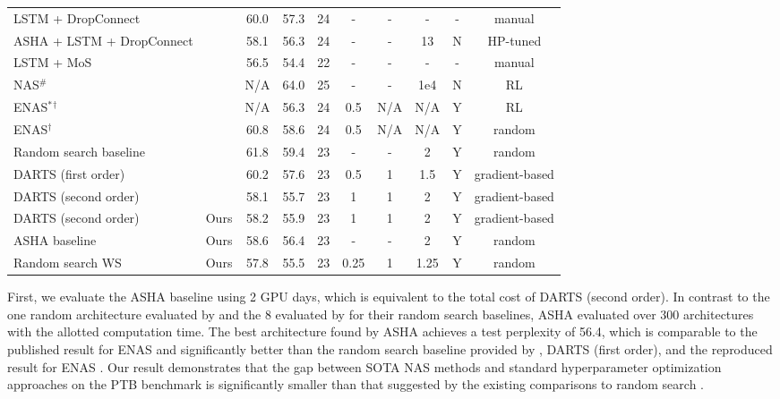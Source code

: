 \documentclass[acmlarge, nonacm]{acmart}
\begin{document}
\begin{table}[h]
{\begin{tabular}{lccccccccc}
\hline
LSTM + DropConnect & \citep{merity2018awd} & 60.0 & 57.3 & 24 & - & - & - & - & manual \\
ASHA + LSTM + DropConnect & \citep{asha} & 58.1 & 56.3 & 24 & - & - & 13 & N & HP-tuned\\
LSTM + MoS & \citep{yang2018breaking} & 56.5 & 54.4 & 22 & - & - & - & - & manual \\
\hline
NAS$^\#$ & \citep{nasRL} & N/A & 64.0 & 25 & - & - & 1e4 &  N & RL \\
ENAS${^*}{^\dagger}$ & \citep{pham18ENAS} & N/A & 56.3 & 24 & 0.5 & N/A & N/A & Y & RL \\
ENAS$^\dagger$ & \citep{liu2018darts} & 60.8 & 58.6 & 24 & 0.5 & N/A & N/A &  Y & random \\
 Random search baseline & \citep{liu2018darts} & 61.8 & 59.4 & 23 & - & - & 2 & Y & random \\
 DARTS (first order)& \citep{liu2018darts}     &  60.2 & 57.6 & 23 & 0.5 & 1 & 1.5 & Y & gradient-based\\
 DARTS (second order)&  \citep{liu2018darts}&  58.1 & 55.7 & 23 & 1 & 1& 2 & Y & gradient-based \\
 \hline
 DARTS (second order)& Ours & 58.2 & 55.9 & 23 & 1 & 1 & 2&Y & gradient-based \\
 ASHA baseline  & Ours & 58.6 & 56.4 & 23 & - & - & 2 & Y & random \\
 Random search WS& Ours & 57.8 & 55.5 & 23 & 0.25 & 1 & 1.25 & Y & random \\
 \hline
 
\end{tabular}}
\end{table}

First, we evaluate the ASHA baseline using 2 GPU days, which is equivalent to the total cost of DARTS (second order). 
In contrast to the one random architecture evaluated by \citet{pham18ENAS} and the 8 evaluated by \citet{liu2018darts} for their random search baselines, ASHA evaluated over 300 architectures with the allotted computation time. The best architecture found by ASHA achieves a test perplexity of 56.4, which is comparable to the published result for ENAS and significantly better than the random search baseline provided by \citet{liu2018darts}, DARTS (first order), and the reproduced result for ENAS \citep{liu2018darts}.  Our result demonstrates that the gap between SOTA NAS methods and standard hyperparameter optimization approaches on the PTB benchmark is significantly smaller than that suggested by the existing comparisons to random search \citep{pham18ENAS, liu2018darts}.  
\end{document}
